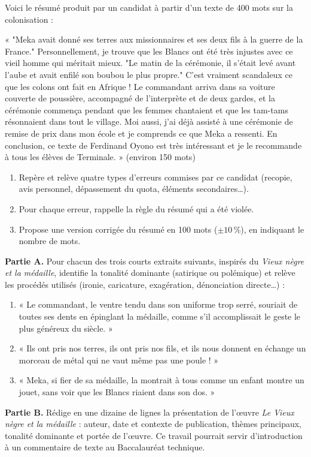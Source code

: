 \documentclass[11pt]{article}
\begin{document}
\begin{exercice}
Voici le résumé produit par un candidat à partir d'un texte de 400 mots sur la colonisation :

« "Meka avait donné ses terres aux missionnaires et ses deux fils à la guerre de la France." Personnellement, je trouve que les Blancs ont été très injustes avec ce vieil homme qui méritait mieux. "Le matin de la cérémonie, il s'était levé avant l'aube et avait enfilé son boubou le plus propre." C'est vraiment scandaleux ce que les colons ont fait en Afrique ! Le commandant arriva dans sa voiture couverte de poussière, accompagné de l'interprète et de deux gardes, et la cérémonie commença pendant que les femmes chantaient et que les tam-tams résonnaient dans tout le village. Moi aussi, j'ai déjà assisté à une cérémonie de remise de prix dans mon école et je comprends ce que Meka a ressenti. En conclusion, ce texte de Ferdinand Oyono est très intéressant et je le recommande à tous les élèves de Terminale. » (environ 150 mots)

\begin{enumerate}
\item Repère et relève quatre types d'erreurs commises par ce candidat (recopie, avis personnel, dépassement du quota, éléments secondaires\ldots).
\item Pour chaque erreur, rappelle la règle du résumé qui a été violée.
\item Propose une version corrigée du résumé en 100 mots ($\pm 10\,\%$), en indiquant le nombre de mots.
\end{enumerate}
\end{exercice}

\begin{exercice}
\textbf{Partie A.} Pour chacun des trois courts extraits suivants, inspirés du \emph{Vieux nègre et la médaille}, identifie la tonalité dominante (satirique ou polémique) et relève les procédés utilisés (ironie, caricature, exagération, dénonciation directe\ldots) :
\begin{enumerate}
\item « Le commandant, le ventre tendu dans son uniforme trop serré, souriait de toutes ses dents en épinglant la médaille, comme s'il accomplissait le geste le plus généreux du siècle. »
\item « Ils ont pris nos terres, ils ont pris nos fils, et ils nous donnent en échange un morceau de métal qui ne vaut même pas une poule ! »
\item « Meka, si fier de sa médaille, la montrait à tous comme un enfant montre un jouet, sans voir que les Blancs riaient dans son dos. »
\end{enumerate}
\textbf{Partie B.} Rédige en une dizaine de lignes la présentation de l'œuvre \emph{Le Vieux nègre et la médaille} : auteur, date et contexte de publication, thèmes principaux, tonalité dominante et portée de l'œuvre. Ce travail pourrait servir d'introduction à un commentaire de texte au Baccalauréat technique.
\end{exercice}
\end{document}
